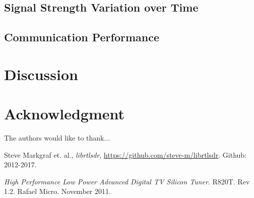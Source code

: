 \documentclass[conference]{IEEEtran}
\begin{document}
\subsection{Signal Strength Variation over Time}

\subsection{Communication Performance}

\section{Discussion}



\section*{Acknowledgment}


The authors would like to thank...







%
%
%
\begin{thebibliography}{1}

Steve Markgraf et. al., \emph{librtlsdr}, \url{https://github.com/steve-m/librtlsdr}. Github: 2012-2017.

\emph{High Performance Low Power Advanced Digital TV Silicon Tuner}. R820T. Rev 1.2. Rafael Micro. November 2011.

\end{thebibliography}




\end{document}
